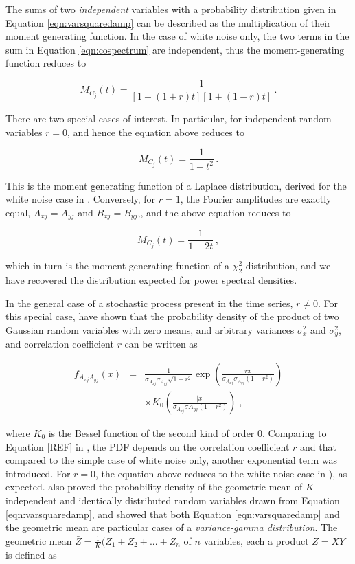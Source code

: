 \documentclass[fleqn,usenatbib]{mnras}
\begin{document}
The sums of two \textit{independent} variables with a probability distribution given in Equation \ref{eqn:varsquaredamp} can be described as the multiplication of their moment generating function. In the case of white noise only, the two terms in the sum in Equation \ref{eqn:cospectrum} are independent, thus the moment-generating function reduces to 

\begin{equation}
M_{C_j}(t) = \frac{1}{[1-(1+r)t][1+(1-r)t]} \, .
\label{eqn:varmgf2}
\end{equation} 

\noindent There are two special cases of interest. In particular, for independent random variables $r=0$, and hence the equation above reduces to 

\[
M_{C_j}(t) = \frac{1}{1-t^2} \, .
\]

\noindent This is the moment generating function of a Laplace distribution, derived for the white noise case in \citet{huppenkothen2018}. Conversely, for $r=1$, the Fourier amplitudes are exactly equal, $A_{xj} = A_{yj}$ and $B_{xj} = B_{yj}$,, and the above equation reduces to

\[
M_{C_j}(t) = \frac{1}{1-2t} \, ,
\]

which in turn is the moment generating function of a $\chi^2_2$ distribution, and we have recovered the distribution expected for power spectral densities.

In the general case of a stochastic process present in the time series, $r \neq 0$. For this special case, \citet{nadarajah2016} have shown that the probability density of the product of two Gaussian random variables with zero means, and arbitrary variances $\sigma_x^2$ and $\sigma_y^2$, and correlation coefficient $r$ can be written as

\begin{eqnarray}
f_{A_{xj}A_{yj}}(x) & = & \frac{1}{\sigma_{A_{xj}}\sigma_{A_{yj}} \sqrt{1 - r^2}} \exp{\left( \frac{rx}{\sigma_{A_{xj}}\sigma_{A_{yj}}(1-r^2)} \right)} \nonumber \\
 & & \times K_0\left( \frac{|x|}{\sigma_{A_{xj}}\sigma{A_{yj}}(1-r^2)} \right) \; ,
\label{eqn:varsquaredamp}
\end{eqnarray}

\noindent where $K_0$ is the Bessel function of the second kind of order $0$. Comparing to Equation [REF] in \citet{huppenkothen2018}, the PDF depends on the correlation coefficient $r$ and that compared to the simple case of white noise only, another exponential term was introduced. For $r=0$, the equation above reduces to the white noise case in \citet{huppenkothen2018}), as expected. \citet{nadarajah2016} also proved the probability density of the geometric mean of $K$ independent and identically distributed random variables drawn from Equation \ref{eqn:varsquaredamp}, and \citet{gaunt2018} showed that both Equation \ref{eqn:varsquaredamp} and the geometric mean are particular cases of a \textit{variance-gamma distribution}. The geometric mean $\bar{Z} =  \frac{1}{K} (Z_1 + Z_2 + ... + Z_n$ of $n$ variables, each a product $Z = XY$ is defined as
\end{document}
